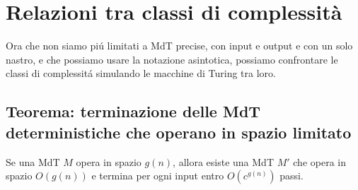\section{Relazioni tra classi di complessità}
Ora che non siamo piú limitati a MdT precise, con input e output e con un solo nastro, e che possiamo usare la notazione asintotica, possiamo confrontare le classi di complessitá simulando le macchine di Turing tra loro. \\

\subsection{Teorema: terminazione delle MdT deterministiche che operano in spazio limitato}
\label{teorema:terminazione_mdt_spazio_limitato}
Se una MdT $M$ opera in spazio $g(n)$, allora esiste una MdT $M'$ che opera in spazio $O(g(n))$ e termina per ogni input entro $O(c^{g(n)})$ passi.
